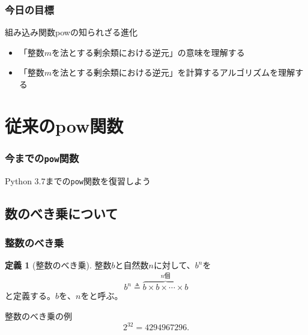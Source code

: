 \documentclass[aspectratio=169,dvipdfmx,14pt,notheorems]{beamer}
\theoremstyle{definition}
\newtheorem{definition}{定義}
\begin{document}
\begin{frame}\frametitle{今日の目標}
\begin{block}{組み込み関数powの知られざる進化}
\begin{itemize}
\item 「整数$m$を法とする剰余類における逆元」の意味を理解する
\item 「整数$m$を法とする剰余類における逆元」を計算するアルゴリズムを理解する
\end{itemize}
\end{block}
\end{frame}

\section{従来のpow関数}

\begin{frame}\frametitle{今までの\texttt{pow}関数}
\begin{center}
\Large Python 3.7までの\texttt{pow}関数を復習しよう
\end{center}
\end{frame}

\subsection{数のべき乗について}

\begin{frame}\frametitle{整数のべき乗}
\begin{definition}[整数のべき乗]
整数$b$と自然数$n$に対して、$b^{n}$を
\begin{equation*}
b^{n} \triangleq \overbrace{b \times b \times \cdots \times b}^{n\text{個}}
\end{equation*}
と定義する。$b$を、$n$をと呼ぶ。
\end{definition}

\begin{exampleblock}{整数のべき乗の例}
\begin{equation*}
2^{32} = 4294967296.
\end{equation*}
\end{exampleblock}

\end{frame}
\end{document}
